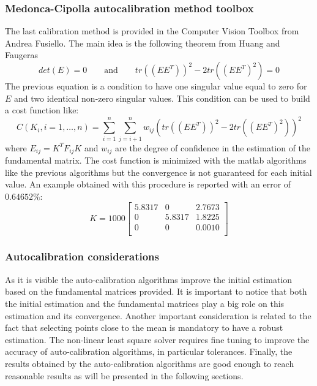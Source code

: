 \documentclass[11pt]{article}
\begin{document}
\subsubsection{Medonca-Cipolla autocalibration method toolbox}
The last calibration method is provided in the Computer Vision Toolbox from Andrea Fusiello. The main idea is the following theorem from Huang and Faugeras \cite{Faugeras89}
\begin{equation}
    det(E) = 0 \qquad \text{and} \qquad tr((EE^T))^2 - 2 tr((EE^T)^2) = 0
\end{equation}
The previous equation is a condition to have one singular value equal to zero for $E$ and two identical non-zero singular values. This condition can be used to build a cost function like:
\begin{equation}
    C(K_i, i = 1,\dots, n) = \sum_{i=1}^{n} \sum_{j=i+1}^{n} w_{ij} (tr((EE^T))^2 - 2 tr((EE^T)^2))^2
\end{equation}
where $E_{ij} = K^TF_{ij}K$ and $w_{ij}$ are the degree of confidence in the estimation of the fundamental matrix. The cost function is minimized with the matlab algorithms like the previous algorithms but the convergence is not guaranteed for each initial value. An example obtained with this procedure is reported with an error of $0.64652\%$:
\begin{equation}
    K = 1000 \begin{bmatrix}
     5.8317  &       0   & 2.7673\\
          0  &  5.8317   & 1.8225\\
          0  &       0   & 0.0010\\ 
\end{bmatrix}
\end{equation}

\bigskip
\subsubsection{Autocalibration considerations}
As it is visible the auto-calibration algorithms improve the initial estimation based on the fundamental matrices provided. It is important to notice that both the initial estimation and the fundamental matrices play a big role on this estimation and its convergence. Another important consideration is related to the fact that selecting points close to the mean is mandatory to have a robust estimation. The non-linear least square solver requires fine tuning to improve the accuracy of auto-calibration algorithms, in particular tolerances. Finally, the results obtained by the auto-calibration algorithms are good enough to reach reasonable results as will be presented in the following sections.
\end{document}
